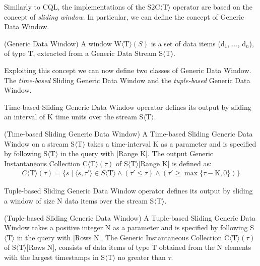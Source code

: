 Similarly to CQL, the implementations of the S2C$\langle\mathrm{T}\rangle$ operator are based on the concept of \textit{sliding window}.
In particular, we can define the concept of Generic Data Window.

\begin{Definition}
(Generic Data Window) A window W$\langle\mathrm{T}\rangle(S)$ is a set of data items (d$_1$, ..., d$_n$), of type $\mathrm{T}$, extracted from a Generic Data Stream S$\langle\mathrm{T}\rangle$. 
\end{Definition}

Exploiting this concept we can now define two classes of Generic Data Window.
The \textit{time-based} Sliding Generic Data Window and the \textit{tuple-based} Generic Data Window.

Time-based Sliding Generic Data Window operator defines its output by sliding an interval of $\mathrm{K}$ time units over the stream S$\langle\mathrm{T}\rangle$.

\begin{Definition}
(Time-based Sliding Generic Data Window) A Time-based Sliding Generic Data Window on a stream S$\langle\mathrm{T}\rangle$ takes a time-interval $\mathrm{K}$ as a parameter and is specified by following S$\langle\mathrm{T}\rangle$ in the query with [Range $\mathrm{K}$].
The output Generic Instantaneous Collection C$\langle\mathrm{T}\rangle(\tau)$ of S$\langle\mathrm{T}\rangle$[Range $\mathrm{K}$] is defined as:
\noindent\begin{align*}
C\langle\mathrm{T}\rangle(\tau)=\{s \mid \langle s,\tau' \rangle \in S\langle\mathrm{T}\rangle \wedge (\tau' \leq \tau) \wedge (\tau' \geq \max\{\tau - \mathrm{K},0\})\}
\end{align*}  
\end{Definition}

Tuple-based Sliding Generic Data Window operator defines its output by sliding a window of size $\mathrm{N}$ data items over the stream S$\langle\mathrm{T}\rangle$.
\begin{Definition}
(Tuple-based Sliding Generic Data Window) A Tuple-based Sliding Generic Data Window takes a positive integer $\mathrm{N}$ as a parameter and is specified by following S$\langle\mathrm{T}\rangle$ in the query with [Rows $\mathrm{N}$].
The Generic Instantaneous Collection C$\langle\mathrm{T}\rangle(\tau)$ of S$\langle\mathrm{T}\rangle$[Rows $\mathrm{N}$], consists of data items of type $\mathrm{T}$ obtained from the $\mathrm{N}$ elements with the largest timestamps in S$\langle\mathrm{T}\rangle$ no greater than $\tau$.
\end{Definition}

